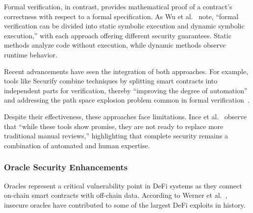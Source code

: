 \documentclass[conference]{IEEEtran}
\begin{document}
    Formal verification, in contrast, provides mathematical proof of a contract's correctness with respect to a formal specification. As Wu et al.~\cite{wu2025exploring} note, ``formal verification can be divided into static symbolic execution and dynamic symbolic execution,'' with each approach offering different security guarantees. Static methods analyze code without execution, while dynamic methods observe runtime behavior.

    Recent advancements have seen the integration of both approaches. For example, tools like Securify combine techniques by splitting smart contracts into independent parts for verification, thereby ``improving the degree of automation'' and addressing the path space explosion problem common in formal verification~\cite{wu2025exploring}.

    Despite their effectiveness, these approaches face limitations. Ince et al.~\cite{ince2025generative} observe that ``while these tools show promise, they are not ready to replace more traditional manual reviews,'' highlighting that complete security remains a combination of automated and human expertise.

    \subsubsection{Oracle Security Enhancements}
    Oracles represent a critical vulnerability point in DeFi systems as they connect on-chain smart contracts with off-chain data. According to Werner et al.~\cite{werner2021sok}, insecure oracles have contributed to some of the largest DeFi exploits in history.
\end{document}
